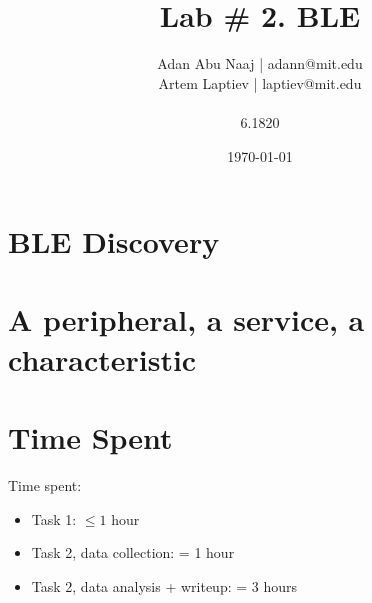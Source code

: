 \documentclass{lab}
\title{Lab \# 2. BLE} %
\author{Adan Abu Naaj | adann@mit.edu \\ Artem Laptiev | laptiev@mit.edu \\\\ 6.1820} %
\date{\today} %
\begin{document}
\maketitle

\newpage

\section{BLE Discovery}

\section{A peripheral, a service, a characteristic}

\section{Time Spent} 

Time spent:

\begin{itemize}
  \item Task 1: $\leq 1$ hour
  \item Task 2, data collection: = 1 hour
  \item Task 2, data analysis + writeup: = 3 hours
\end{itemize}
\end{document}
